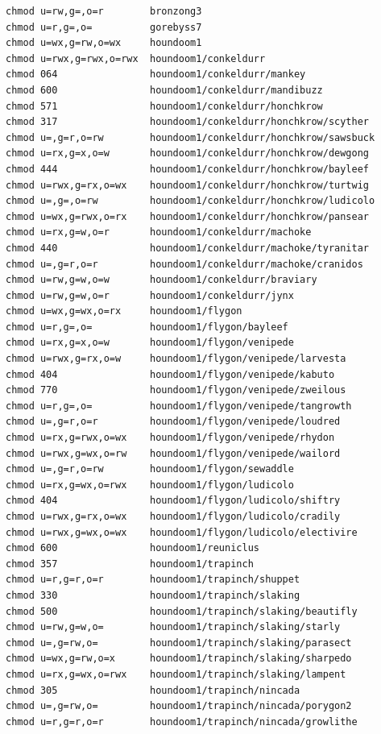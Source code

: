 \documentclass{article}
\begin{document}
\begin{lstlisting}
chmod u=rw,g=,o=r        bronzong3
chmod u=r,g=,o=          gorebyss7
chmod u=wx,g=rw,o=wx     houndoom1
chmod u=rwx,g=rwx,o=rwx  houndoom1/conkeldurr
chmod 064                houndoom1/conkeldurr/mankey
chmod 600                houndoom1/conkeldurr/mandibuzz
chmod 571                houndoom1/conkeldurr/honchkrow
chmod 317                houndoom1/conkeldurr/honchkrow/scyther
chmod u=,g=r,o=rw        houndoom1/conkeldurr/honchkrow/sawsbuck
chmod u=rx,g=x,o=w       houndoom1/conkeldurr/honchkrow/dewgong
chmod 444                houndoom1/conkeldurr/honchkrow/bayleef
chmod u=rwx,g=rx,o=wx    houndoom1/conkeldurr/honchkrow/turtwig
chmod u=,g=,o=rw         houndoom1/conkeldurr/honchkrow/ludicolo
chmod u=wx,g=rwx,o=rx    houndoom1/conkeldurr/honchkrow/pansear
chmod u=rx,g=w,o=r       houndoom1/conkeldurr/machoke
chmod 440                houndoom1/conkeldurr/machoke/tyranitar
chmod u=,g=r,o=r         houndoom1/conkeldurr/machoke/cranidos
chmod u=rw,g=w,o=w       houndoom1/conkeldurr/braviary
chmod u=rw,g=w,o=r       houndoom1/conkeldurr/jynx
chmod u=wx,g=wx,o=rx     houndoom1/flygon
chmod u=r,g=,o=          houndoom1/flygon/bayleef
chmod u=rx,g=x,o=w       houndoom1/flygon/venipede
chmod u=rwx,g=rx,o=w     houndoom1/flygon/venipede/larvesta
chmod 404                houndoom1/flygon/venipede/kabuto
chmod 770                houndoom1/flygon/venipede/zweilous
chmod u=r,g=,o=          houndoom1/flygon/venipede/tangrowth
chmod u=,g=r,o=r         houndoom1/flygon/venipede/loudred
chmod u=rx,g=rwx,o=wx    houndoom1/flygon/venipede/rhydon
chmod u=rwx,g=wx,o=rw    houndoom1/flygon/venipede/wailord
chmod u=,g=r,o=rw        houndoom1/flygon/sewaddle
chmod u=rx,g=wx,o=rwx    houndoom1/flygon/ludicolo
chmod 404                houndoom1/flygon/ludicolo/shiftry
chmod u=rwx,g=rx,o=wx    houndoom1/flygon/ludicolo/cradily
chmod u=rwx,g=wx,o=wx    houndoom1/flygon/ludicolo/electivire
chmod 600                houndoom1/reuniclus
chmod 357                houndoom1/trapinch
chmod u=r,g=r,o=r        houndoom1/trapinch/shuppet
chmod 330                houndoom1/trapinch/slaking
chmod 500                houndoom1/trapinch/slaking/beautifly
chmod u=rw,g=w,o=        houndoom1/trapinch/slaking/starly
chmod u=,g=rw,o=         houndoom1/trapinch/slaking/parasect
chmod u=wx,g=rw,o=x      houndoom1/trapinch/slaking/sharpedo
chmod u=rx,g=wx,o=rwx    houndoom1/trapinch/slaking/lampent
chmod 305                houndoom1/trapinch/nincada
chmod u=,g=rw,o=         houndoom1/trapinch/nincada/porygon2
chmod u=r,g=r,o=r        houndoom1/trapinch/nincada/growlithe

\end{lstlisting}
\end{document}
